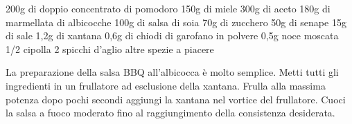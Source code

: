 \label{salsa-bbq}
\serves{-}
\begin{ingreds}
	200g di doppio concentrato di pomodoro
	150g di miele
	300g di aceto
	180g di marmellata di albicocche
	100g di salsa di soia
	70g di zucchero
	50g di senape
	15g di sale
	1,2g di xantana
	0,6g di chiodi di garofano in polvere
	0,5g noce moscata
	1/2 cipolla
	2 spicchi d'aglio
	altre spezie a piacere

\end{ingreds}

\begin{method}
La preparazione della salsa BBQ all'albicocca è molto semplice. Metti tutti gli ingredienti in un frullatore ad esclusione della xantana. Frulla alla massima potenza dopo pochi secondi aggiungi la xantana nel vortice del frullatore.
Cuoci la salsa a fuoco moderato fino al raggiungimento della consistenza desiderata.
\end{method}



